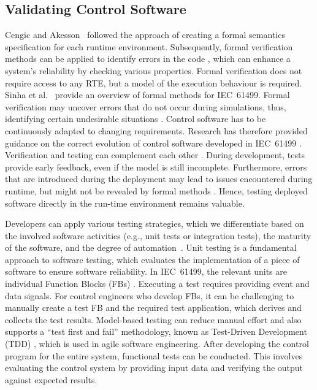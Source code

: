 \begin{bibunit}
\subsection{Validating Control Software}
Cengic and Akesson~\cite{cengic_executionsemantics} followed the approach of creating a formal semantics specification for each runtime environment. Subsequently, formal verification methods can be applied to identify errors in the code \cite{xavier2024framework}, which can enhance a system's reliability by checking various properties. Formal verification does not require access to any RTE, but a model of the execution behaviour is required. Sinha et al.~\cite{Sinha.2019} provide an overview of formal methods for IEC~61499. Formal verification may uncover errors that do not occur during simulations, thus, identifying certain undesirable situations \cite{lilli2023formal}. 
Control software has to be continuously adapted to changing requirements. Research has therefore provided guidance on the correct evolution of control software developed in IEC~61499 \cite{faqrizal_guidedevolution}. 
Verification and testing can complement each other \cite{Hussain.2006}. During development, tests provide early feedback, even if the model is still incomplete. Furthermore, errors that are introduced during the deployment may lead to issues encountered during runtime, but might not be revealed by formal methods \cite{ovsiannikova2023formal} \cite{xavier2023formal}. Hence, testing deployed software directly in the run-time environment remains valuable.

Developers can apply various testing strategies, which we differentiate based on the involved software activities (e.g., unit tests or integration tests), the maturity of the software, and the degree of automation~\cite{softwareTesting}. 
Unit testing is a fundamental approach to software testing, which evaluates the implementation of a piece of software \cite{softwareTesting} to ensure software reliability.
In IEC~61499, the relevant units are individual Function Blocks (FBs) \cite{hametner2014}. Executing a test requires providing event and data signals. For control engineers who develop FBs, it can be challenging to manually create a test FB and the required test application, which derives and collects the test results. Model-based testing can reduce manual effort and also supports a ``test first and fail'' methodology, known as Test-Driven Development (TDD) \cite{hametner2014}, which is used in agile software engineering.  
After developing the control program for the entire system, functional tests can be conducted. This involves evaluating the control system by providing input data and verifying the output against expected results.


\end{bibunit}
